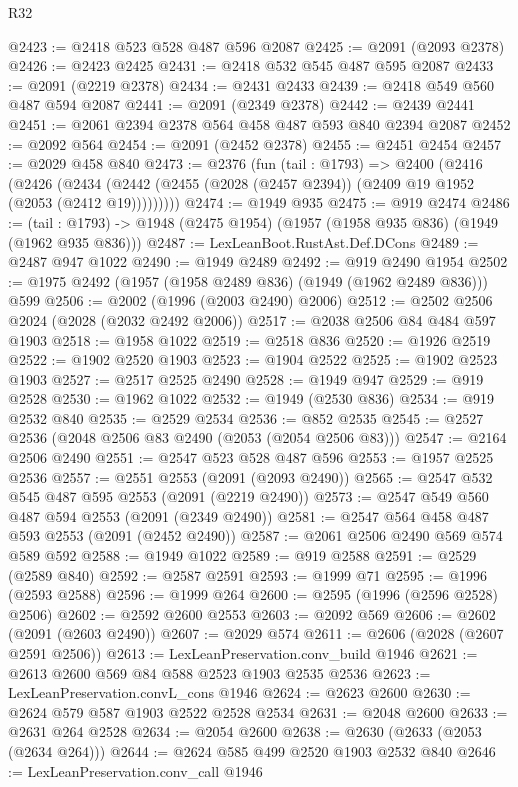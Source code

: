 \begin{lexlean}{R32}
\begin{coremodule}
@2423 := @2418 @523 @528 @487 @596 @2087
@2425 := @2091 (@2093 @2378)
@2426 := @2423 @2425
@2431 := @2418 @532 @545 @487 @595 @2087
@2433 := @2091 (@2219 @2378)
@2434 := @2431 @2433
@2439 := @2418 @549 @560 @487 @594 @2087
@2441 := @2091 (@2349 @2378)
@2442 := @2439 @2441
@2451 := @2061 @2394 @2378 @564 @458 @487 @593 @840 @2394 @2087
@2452 := @2092 @564
@2454 := @2091 (@2452 @2378)
@2455 := @2451 @2454
@2457 := @2029 @458 @840
@2473 := @2376
    (fun (tail : @1793) =>
    @2400
      (@2416
        (@2426
          (@2434 (@2442 (@2455 (@2028 (@2457 @2394)) (@2409 @19 @1952 (@2053 (@2412 @19)))))))))
@2474 := @1949 @935
@2475 := @919 @2474
@2486 := (tail : @1793) -> @1948 (@2475 @1954) (@1957 (@1958 @935 @836) (@1949 (@1962 @935 @836)))
@2487 := LexLeanBoot.RustAst.Def.DCons
@2489 := @2487 @947 @1022
@2490 := @1949 @2489
@2492 := @919 @2490 @1954
@2502 := @1975 @2492 (@1957 (@1958 @2489 @836) (@1949 (@1962 @2489 @836))) @599
@2506 := @2002 (@1996 (@2003 @2490) @2006)
@2512 := @2502 @2506 @2024 (@2028 (@2032 @2492 @2006))
@2517 := @2038 @2506 @84 @484 @597 @1903
@2518 := @1958 @1022
@2519 := @2518 @836
@2520 := @1926 @2519
@2522 := @1902 @2520 @1903
@2523 := @1904 @2522
@2525 := @1902 @2523 @1903
@2527 := @2517 @2525 @2490
@2528 := @1949 @947
@2529 := @919 @2528
@2530 := @1962 @1022
@2532 := @1949 (@2530 @836)
@2534 := @919 @2532 @840
@2535 := @2529 @2534
@2536 := @852 @2535
@2545 := @2527 @2536 (@2048 @2506 @83 @2490 (@2053 (@2054 @2506 @83)))
@2547 := @2164 @2506 @2490
@2551 := @2547 @523 @528 @487 @596
@2553 := @1957 @2525 @2536
@2557 := @2551 @2553 (@2091 (@2093 @2490))
@2565 := @2547 @532 @545 @487 @595 @2553 (@2091 (@2219 @2490))
@2573 := @2547 @549 @560 @487 @594 @2553 (@2091 (@2349 @2490))
@2581 := @2547 @564 @458 @487 @593 @2553 (@2091 (@2452 @2490))
@2587 := @2061 @2506 @2490 @569 @574 @589 @592
@2588 := @1949 @1022
@2589 := @919 @2588
@2591 := @2529 (@2589 @840)
@2592 := @2587 @2591
@2593 := @1999 @71
@2595 := @1996 (@2593 @2588)
@2596 := @1999 @264
@2600 := @2595 (@1996 (@2596 @2528) @2506)
@2602 := @2592 @2600 @2553
@2603 := @2092 @569
@2606 := @2602 (@2091 (@2603 @2490))
@2607 := @2029 @574
@2611 := @2606 (@2028 (@2607 @2591 @2506))
@2613 := LexLeanPreservation.conv_build @1946
@2621 := @2613 @2600 @569 @84 @588 @2523 @1903 @2535 @2536
@2623 := LexLeanPreservation.convL_cons @1946
@2624 := @2623 @2600
@2630 := @2624 @579 @587 @1903 @2522 @2528 @2534
@2631 := @2048 @2600
@2633 := @2631 @264 @2528
@2634 := @2054 @2600
@2638 := @2630 (@2633 (@2053 (@2634 @264)))
@2644 := @2624 @585 @499 @2520 @1903 @2532 @840
@2646 := LexLeanPreservation.conv_call @1946

\end{coremodule}
\end{lexlean}
